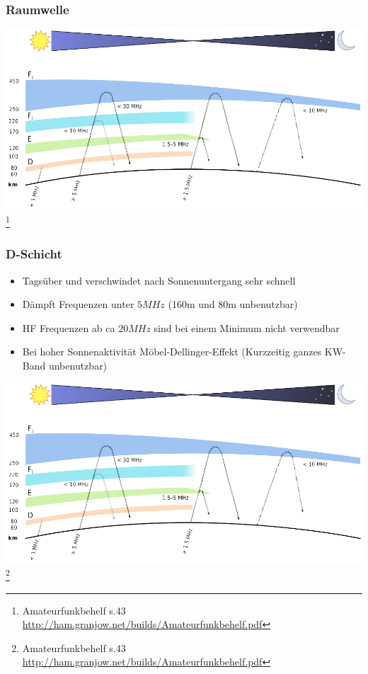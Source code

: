 \begin{frame}
    \frametitle{Raumwelle}
	\begin{center}
        \includegraphics[width=.9\textwidth]{a08/schichten_behelf_43.png}
        \footnote{\tiny Amateurfunkbehelf s.43 \url{http://ham.granjow.net/builds/Amateurfunkbehelf.pdf}}
    \end{center}
\end{frame}

\begin{frame}
    \frametitle{D-Schicht}
    \begin{itemize}
    			\item Tagsüber und verschwindet nach Sonnenuntergang sehr schnell
				\item Dämpft Frequenzen unter $5MHz$ (160m und 80m unbenutzbar)
       		 	\item HF Frequenzen ab ca $20MHz$ sind bei einem Minimum nicht verwendbar
       		 	\item Bei hoher Sonnenaktivität Möbel-Dellinger-Effekt (Kurzzeitig ganzes KW-Band unbenutzbar)
    \end{itemize}
    \begin{center}
        \includegraphics[width=.6\textwidth]{a08/schichten_behelf_43.png}
        \footnote{\tiny Amateurfunkbehelf s.43 \url{http://ham.granjow.net/builds/Amateurfunkbehelf.pdf}}
    \end{center}
\end{frame}

